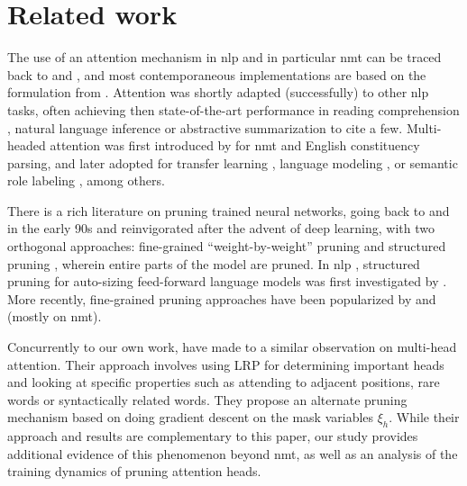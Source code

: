 \section{Related work}
\label{sec:related}

The use of an attention mechanism in \ac{nlp} and in particular \ac{nmt} can be traced back to \citet{bahdanau15alignandtranslate} and \citet{cho2014learning}, and most contemporaneous implementations are based on the formulation from \citet{luong2015effective}. Attention was shortly adapted (successfully) to other \ac{nlp} tasks, often achieving then state-of-the-art performance in reading comprehension \citep{cheng-etal-2016-long}, natural language inference \citep{parikh-etal-2016-decomposable} or abstractive summarization \citep{paulus2017deep} to cite a few. Multi-headed attention was first introduced by \citet{vaswani2017attention} for \ac{nmt} and English constituency parsing, and later adopted for transfer learning \citep{radford2018improving,devlin2018bert}, language modeling \citep{dai2019transformer,radford2019language}, or semantic role labeling \citep{strubell2018linguistically}, among others.

There is a rich literature on pruning trained neural networks, going back to \citet{lecun1989optimal} and \citet{hassibi92second} in the early 90s and reinvigorated after the advent of deep learning, with two orthogonal approaches: fine-grained ``weight-by-weight'' pruning \citep{han2015learning} and structured pruning \citep{Anwar:2017:SPD:3051701.3005348,li2016pruning,molchanov2016pruning}, wherein entire parts of the model are pruned. In \ac{nlp} , structured pruning for auto-sizing feed-forward language models was first investigated by \citet{murray-chiang-2015-auto}. More recently, fine-grained pruning approaches have been popularized by \citet{see-etal-2016-compression} and \citet{kim-rush-2016-sequence} (mostly on \ac{nmt}).

Concurrently to our own work, \citet{voita2019analyzing} have made to a similar observation on multi-head attention. Their approach involves using LRP \citep{binder2016layer} for determining important heads and looking at specific properties such as attending to adjacent positions, rare words or syntactically related words. They propose an alternate pruning mechanism based on doing gradient descent on the mask variables $\xi_h$. While their approach and results are complementary to this paper, our study provides additional evidence of this phenomenon beyond \ac{nmt}, as well as an analysis of the training dynamics of pruning attention heads.